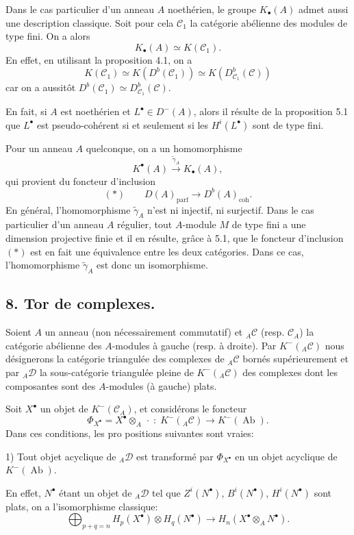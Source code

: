 \documentclass[11pt]{article}
\providecommand{\parf}{\mathrm{parf}}
\providecommand{\coh}{\mathrm{coh}}
\providecommand{\cC}{\mathcal C}
\providecommand{\Ab}{\operatorname{Ab}}
\providecommand{\cC}{\mathcal C}
\providecommand{\cD}{\mathcal D}
\providecommand{\Ab}{\operatorname{Ab}}
\providecommand{\parf}{\mathrm{parf}}
\providecommand{\coh}{\mathrm{coh}}
\begin{document}
Dans le cas particulier d'un anneau $A$ noethérien, le groupe $K_\bullet(A)$ admet aussi une description classique. Soit pour cela $\cC_1$ la catégorie abélienne des modules de type fini. On a alors
\[
K_\bullet(A)\simeq K(\cC_1).
\]
En effet, en utilisant la proposition 4.1, on a
\[
K(\cC_1)\simeq K(D^b(\cC_1))\simeq K(D^b_{\cC_1}(\cC))
\]
car on a
aussitôt $D^b(\cC_1)\simeq D^b_{\cC_1}(\cC)$.

En fait, si $A$ est noethérien et $L^\bullet\in D^-(A)$, alors il résulte de la proposition 5.1 que $L^\bullet$ est pseudo-cohérent si et seulement si les $H^i(L^\bullet)$ sont de type fini.

Pour un anneau $A$ quelconque, on a un homomorphisme
\[
K^{\bullet}(A)\xrightarrow{\widetilde\gamma_A}K_\bullet(A),
\]
qui provient du foncteur d'inclusion
\[
(*)\qquad D(A)_{\parf}\longrightarrow D^b(A)_{\coh}.
\]
En général, l'homomorphisme $\widetilde\gamma_A$ n'est ni injectif, ni surjectif. Dans le cas particulier d'un anneau $A$ régulier, tout $A$-module $M$ de type fini a une dimension projective finie et il en résulte, grâce à 5.1, que le foncteur d'inclusion $(*)$ est en fait une équivalence entre les deux catégories. Dans ce cas, l'homomorphisme $\widetilde\gamma_A$ est donc un isomorphisme.

\subsection*{8. Tor de complexes.}

Soient $A$ un anneau (non nécessairement commutatif) et ${}_A\cC$ (resp. $\cC_A$) la catégorie abélienne des $A$-modules à gauche (resp. à droite). Par $K^-({}_A\cC)$ nous désignerons la catégorie triangulée des complexes de ${}_A\cC$ bornés supérieurement et par ${}_A\cD$ la sous-catégorie triangulée pleine de $K^-({}_A\cC)$ des complexes dont les composantes sont des $A$-modules (à gauche) plats.

Soit $X^\bullet$ un objet de $K^-(\cC_A)$, et considérons le foncteur
\[
\Phi_{X^\bullet}=X^\bullet\otimes_A\,\cdot\;:\;K^-({}_A\cC)\longrightarrow K^-(\Ab).
\]
Dans ces conditions, les
pro%
positions suivantes sont vraies:

1) Tout objet acyclique de ${}_A\cD$ est transformé par $\Phi_{X^\bullet}$ en un objet acyclique de $K^-(\Ab)$.

En effet, $N^\bullet$ étant un objet de ${}_A\cD$ tel que $Z^i(N^\bullet)$, $B^i(N^\bullet)$, $H^i(N^\bullet)$ sont plats, on a l'isomorphisme classique:
\[
\bigoplus_{p+q=n}H_p(X^\bullet)\otimes H_q(N^\bullet)
\longrightarrow H_n(X^\bullet\otimes_A N^\bullet).
\]
\end{document}
